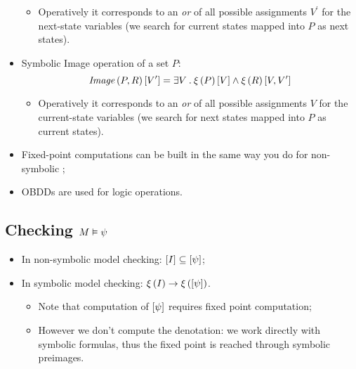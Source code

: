 \begin{itemize}
\begin{itemize}
        \item   Operatively it corresponds to an \emph{or} of all possible
                assignments $V^\prime$ for the next-state variables (we
                search for current states mapped into $P$ as next states).

        \end{itemize}

    \item   Symbolic Image operation of a set $P$:
        \[
        \mbox{\emph{Image}}\left({P,R}\right)[V'] = \exists V \:.\: \xi\left({P}\right)[V] \wedge
                          \xi\left({R}\right)[V, V^\prime]
        \]
        \begin{itemize}

        \item   Operatively it corresponds to an \emph{or} of all possible
                assignments $V$ for the current-state variables (we search
                for next states mapped into $P$ as current states).

        \end{itemize}

    \item   Fixed-point computations can be built in the same way you do
            for non-symbolic \CTL;

    \item   OBDDs are used for logic operations.

    \end{itemize}

\subsection{Checking $M \vDash \psi$}

    \begin{itemize}

    \item   In non-symbolic model checking: $\left[{I}\right] \subseteq
            \left[{\psi}\right]$;

    \item   In symbolic model checking: $\xi\left({I}\right) \rightarrow
            \xi\left({\left[{\psi}\right]}\right)$.
        \begin{itemize}
        \item   Note that computation of $\left[{\psi}\right]$ requires fixed
                point computation;
        \item   However we don't compute the denotation: we work directly
                with symbolic formulas, thus the fixed point is reached
                through symbolic preimages.
        \end{itemize}

    \end{itemize}

